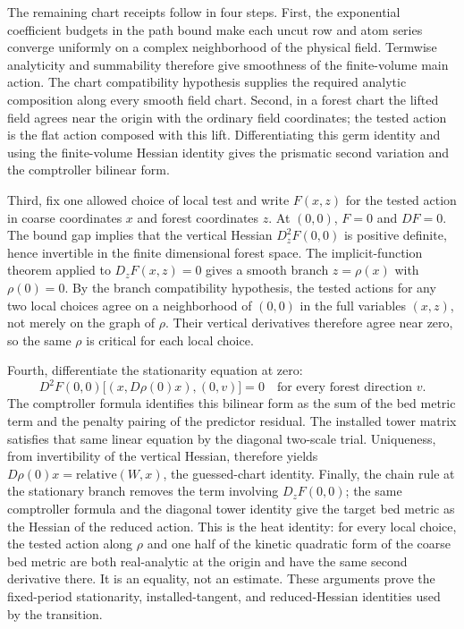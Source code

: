 The remaining chart receipts follow in four steps. First, the exponential
coefficient budgets in the path bound make each uncut row and atom series
converge uniformly on a complex neighborhood of the physical field. Termwise
analyticity and summability therefore give smoothness of the finite-volume
main action. The chart compatibility hypothesis supplies the required analytic
composition along every smooth field chart. Second, in a forest chart the
lifted field agrees near the origin with the ordinary field coordinates;
the tested action is the flat action composed with this lift. Differentiating
this germ identity and using the finite-volume Hessian identity gives the
prismatic second variation and the comptroller bilinear form.

Third, fix one allowed choice of local test and write $F(x,z)$ for the
tested action in coarse coordinates $x$ and forest coordinates $z$. At
$(0,0)$, $F=0$ and $D F=0$. The bound gap implies that the vertical Hessian
$D_z^2F(0,0)$ is positive definite, hence invertible in the finite
dimensional forest space. The implicit-function theorem applied to
$D_zF(x,z)=0$ gives a smooth branch $z=\rho(x)$ with $\rho(0)=0$.
By the branch compatibility hypothesis, the tested actions for any two
local choices agree on a neighborhood of $(0,0)$ in the full variables
$(x,z)$, not merely on the graph of $\rho$. Their vertical derivatives
therefore agree near zero, so the same $\rho$ is critical for each
local choice.

Fourth, differentiate the stationarity equation at zero:
\[
 D^2F(0,0)\big[(x,D\rho(0)x),(0,v)\big]=0
 \quad\text{for every forest direction }v.
\]
The comptroller formula identifies this bilinear form as the sum of the
bed metric term and the penalty pairing of the predictor residual. The
installed tower matrix satisfies that same linear equation by the diagonal
two-scale trial. Uniqueness, from invertibility of the vertical Hessian,
therefore yields
$D\rho(0)x=\mathrm{relative}(W,x)$, the guessed-chart identity. Finally,
the chain rule at the stationary branch removes the term involving
$D_zF(0,0)$; the same comptroller formula and the diagonal tower identity
give the target bed metric as the Hessian of the reduced action. This is the
heat identity: for every local choice, the tested action along $\rho$
and one half of the kinetic quadratic form of the coarse bed metric
are both real-analytic at the origin and have the same second
derivative there. It is an equality, not an estimate. These arguments prove the fixed-period stationarity,
installed-tangent, and reduced-Hessian identities used by the transition.

